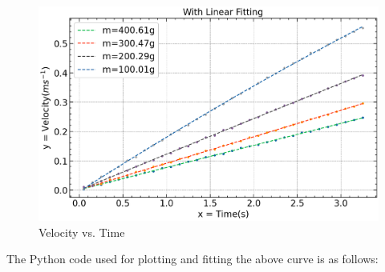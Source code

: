 \documentclass{article}
\begin{document}
 \begin{figure}[H]
 	\centering
 	\includegraphics[scale=0.7]{vel vs. time (ffit).png}
 	\caption{Velocity vs. Time}
 	\label{figure:velf}%
 \end{figure}

\pagebreak

The Python code used for plotting and fitting the above curve is as follows:
\end{document}
